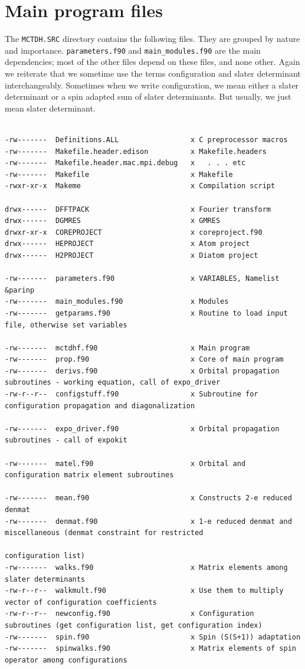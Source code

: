 \documentclass[10pt,leqno, oneside]{book}
\begin{document}
\section{Main program files}

The \verb#MCTDH.SRC# directory contains the following files.  They are grouped by nature and importance.
\verb#parameters.f90# and \verb#main_modules.f90# are the main dependencies; most of the other files depend
on these files, and none other.  Again we reiterate that we sometime use the terms configuration and slater determinant 
interchangeably.  Sometimes when we write configuration, we mean either a slater determinant or a spin adapted sum
of slater determinants.  But usually, we just mean slater determinant.

{\footnotesize
\begin{verbatim}

-rw-------  Definitions.ALL                 x C preprocessor macros
-rw-------  Makefile.header.edison          x Makefile.headers
-rw-------  Makefile.header.mac.mpi.debug   x   . . . etc
-rw-------  Makefile                        x Makefile
-rwxr-xr-x  Makeme                          x Compilation script

drwx------  DFFTPACK                        x Fourier transform
drwx------  DGMRES                          x GMRES
drwxr-xr-x  COREPROJECT                     x coreproject.f90
drwx------  HEPROJECT                       x Atom project
drwx------  H2PROJECT                       x Diatom project

-rw-------  parameters.f90                  x VARIABLES, Namelist &parinp
-rw-------  main_modules.f90                x Modules
-rw-------  getparams.f90                   x Routine to load input file, otherwise set variables

-rw-------  mctdhf.f90                      x Main program
-rw-------  prop.f90                        x Core of main program
-rw-------  derivs.f90                      x Orbital propagation subroutines - working equation, call of expo_driver
-rw-r--r--  configstuff.f90                 x Subroutine for configuration propagation and diagonalization

-rw-------  expo_driver.f90                 x Orbital propagation subroutines - call of expokit

-rw-------  matel.f90                       x Orbital and configuration matrix element subroutines

-rw-------  mean.f90                        x Constructs 2-e reduced denmat
-rw-------  denmat.f90                      x 1-e reduced denmat and miscellaneous (denmat constraint for restricted
                                                                             configuration list)
-rw-------  walks.f90                       x Matrix elements among slater determinants
-rw-r--r--  walkmult.f90                    x Use them to multiply vector of configuration coefficients
-rw-r--r--  newconfig.f90                   x Configuration subroutines (get configuration list, get configuration index)
-rw-------  spin.f90                        x Spin (S(S+1)) adaptation
-rw-------  spinwalks.f90                   x Matrix elements of spin operator among configurations


\end{verbatim}}
\end{document}
